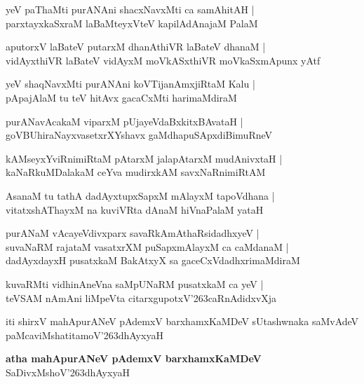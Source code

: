 \begin{shloka}
yeV paThaMti purANAni shacxNavxMti ca samAhitAH |\\
parxtayxkaSxraM laBaMteyxVteV kapilAdAnajaM PalaM
\end{shloka}

\begin{shloka}
aputorxV laBateV putarxM dhanAthiVR laBateV dhanaM |\\
vidAyxthiVR laBateV vidAyxM moVkASxthiVR moVkaSxmApunx yAtf
\end{shloka}

\begin{shloka}
yeV shaqNavxMti purANAni koVTijanAmxjiRtaM Kalu |\\
pApajAlaM tu teV hitAvx gacaCxMti harimaMdiraM 
\end{shloka}

\begin{shloka}
purANavAcakaM viparxM pUjayeVdaBxkitxBAvataH |\\
goVBUhiraNayxvasetxrXYshavx gaMdhapuSApxdiBimuRneV
\end{shloka}

\begin{shloka}
kAMseyxYviRnimiRtaM pAtarxM jalapAtarxM mudAnivxtaH |\\
kaNaRkuMDalakaM ceYva mudirxkAM savxNaRnimiRtAM 
\end{shloka}

\begin{shloka}
AsanaM tu tathA dadAyxtupxSapxM mAlayxM tapoVdhana |\\
vitatxshAThayxM na kuviVRta dAnaM hiVnaPalaM yataH
\end{shloka}

\begin{shloka}
purANaM vAcayeVdivxparx savaRkAmAthaRsidadhxyeV |\\
suvaNaRM rajataM vasatxrXM puSapxmAlayxM ca caMdanaM |\\
dadAyxdayxH pusatxkaM BakAtxyX sa gaceCxVdadhxrimaMdiraM 
\end{shloka}

\begin{shloka}
kuvaRMti vidhinAneVna saMpUNaRM pusatxkaM ca yeV |\\
teVSAM nAmAni liMpeVta citarxgupotxV\char'263caRnAdidxvXja 
\end{shloka}
iti shirxV mahApurANeV pAdemxV barxhamxKaMDeV sUtashwnaka saMvAdeV paMcaviMshatitamoV\char'263dhAyxyaH

\begin{center}
\textbf{\large atha mahApurANeV pAdemxV barxhamxKaMDeV}\\
SaDivxMshoV\char'263dhAyxyaH
\end{center}


